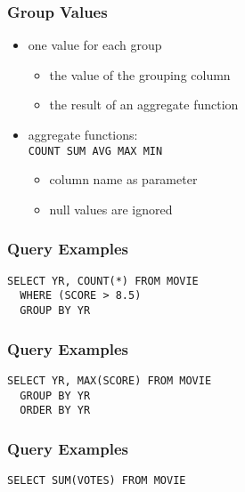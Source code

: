\documentclass[dvipsnames]{beamer}
\theoremstyle{plain}
\begin{document}
\begin{frame}[fragile]
  \frametitle{Group Values}

  \begin{itemize}
    \item one value for each group
    \begin{itemize}
      \item the value of the grouping column
      \item the result of an aggregate function
    \end{itemize}

    \pause
    \item aggregate functions:\\
      \lstinline!COUNT SUM AVG MAX MIN!
    \begin{itemize}
      \item column name as parameter
      \item null values are ignored
    \end{itemize}
  \end{itemize}
\end{frame}

\begin{frame}[fragile]
  \frametitle{Query Examples}

  \begin{example}
    \begin{lstlisting}
SELECT YR, COUNT(*) FROM MOVIE
  WHERE (SCORE > 8.5)
  GROUP BY YR
    \end{lstlisting}
  \end{example}
\end{frame}

\begin{frame}[fragile]
  \frametitle{Query Examples}

  \begin{example}
    \begin{lstlisting}
SELECT YR, MAX(SCORE) FROM MOVIE
  GROUP BY YR
  ORDER BY YR
    \end{lstlisting}
  \end{example}
\end{frame}

\begin{frame}[fragile]
  \frametitle{Query Examples}

  \begin{example}
    \begin{lstlisting}
SELECT SUM(VOTES) FROM MOVIE
    \end{lstlisting}
  \end{example}
\end{frame}
\end{document}
